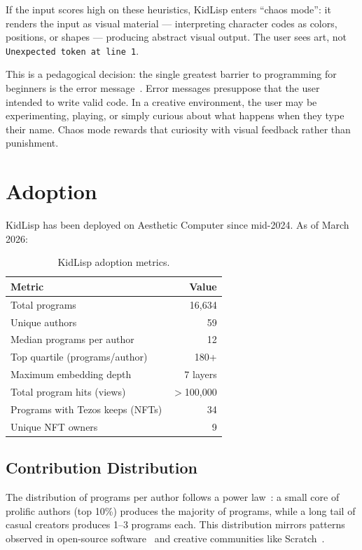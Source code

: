 \documentclass[sigconf,nonacm]{acmart}
\begin{document}
If the input scores high on these heuristics, KidLisp enters ``chaos mode'': it renders the input as visual material --- interpreting character codes as colors, positions, or shapes --- producing abstract visual output. The user sees art, not \texttt{Unexpected token at line 1}.

This is a pedagogical decision: the single greatest barrier to programming for beginners is the error message~\cite{papert1980mindstorms}. Error messages presuppose that the user intended to write valid code. In a creative environment, the user may be experimenting, playing, or simply curious about what happens when they type their name. Chaos mode rewards that curiosity with visual feedback rather than punishment.

\section{Adoption}
\label{sec:adoption}

KidLisp has been deployed on Aesthetic Computer since mid-2024. As of March 2026:

\begin{table}[h]
\small
\centering
\begin{tabular}{lr}
\toprule
\textbf{Metric} & \textbf{Value} \\
\midrule
Total programs & 16,634 \\
Unique authors & 59 \\
Median programs per author & 12 \\
Top quartile (programs/author) & 180+ \\
Maximum embedding depth & 7 layers \\
Total program hits (views) & $>$100,000 \\
Programs with Tezos keeps (NFTs) & 34 \\
Unique NFT owners & 9 \\
\bottomrule
\end{tabular}
\caption{KidLisp adoption metrics.}
\label{tab:adoption}
\end{table}

\subsection{Contribution Distribution}

The distribution of programs per author follows a power law~\cite{barabasi1999emergence}: a small core of prolific authors (top 10\%) produces the majority of programs, while a long tail of casual creators produces 1--3 programs each. This distribution mirrors patterns observed in open-source software~\cite{eghbal2020working} and creative communities like Scratch~\cite{resnick2009scratch}.
\end{document}
